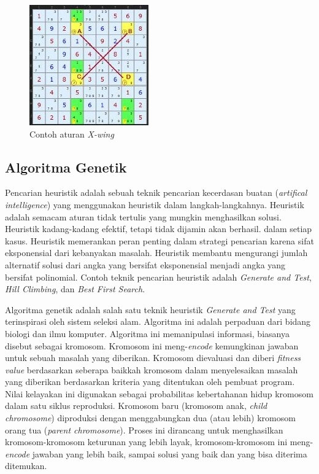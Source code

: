 \begin{figure}
\centering
\captionsetup{justification=centering}
\includegraphics[scale=1]{Gambar/HybridGenetic6}
\caption[Contoh aturan  \textit{X-wing}  ~\cite{johanna:12:hybrid}]{Contoh aturan  \textit{X-wing} ~\cite{johanna:12:hybrid}}
\label{fig:hybrid6}
\end{figure}

\subsection{Algoritma Genetik}
\label{sec:genetik}

Pencarian heuristik adalah sebuah teknik pencarian kecerdasan buatan (\textit{artifical intelligence}) yang menggunakan heuristik dalam langkah-langkahnya. Heuristik adalah semacam aturan tidak tertulis yang mungkin menghasilkan solusi. Heuristik kadang-kadang efektif, tetapi tidak dijamin akan berhasil. dalam setiap kasus. Heuristik memerankan peran penting dalam strategi pencarian karena sifat eksponensial dari kebanyakan masalah. Heuristik membantu mengurangi jumlah alternatif solusi dari angka yang bersifat eksponensial menjadi angka yang bersifat polinomial. Contoh teknik pencarian heuristik adalah \textit{Generate and Test}, \textit{Hill Climbing}, dan \textit{Best First Search}.

Algoritma genetik adalah salah satu teknik heuristik \textit{Generate and Test} yang terinspirasi oleh sistem seleksi alam. Algoritma ini adalah perpaduan dari bidang biologi dan ilmu komputer. Algoritma ini memanipulasi informasi, biasanya disebut sebagai kromosom. Kromosom ini meng-\textit{encode} kemungkinan jawaban untuk sebuah masalah yang diberikan. Kromosom dievaluasi dan diberi \textit{fitness value} berdasarkan seberapa baikkah kromosom dalam menyelesaikan masalah yang diberikan berdasarkan kriteria yang ditentukan oleh pembuat program. Nilai kelayakan ini digunakan sebagai probabilitas kebertahanan hidup kromosom dalam satu siklus reproduksi. Kromosom baru (kromosom anak, \textit{child chromosome}) diproduksi dengan menggabungkan dua (atau lebih) kromosom orang tua (\textit{parent chromosome}). Proses ini dirancang untuk menghasilkan kromosom-kromosom keturunan yang lebih layak, kromosom-kromosom ini meng-\textit{encode} jawaban yang lebih baik, sampai solusi yang baik dan yang bisa diterima ditemukan.

